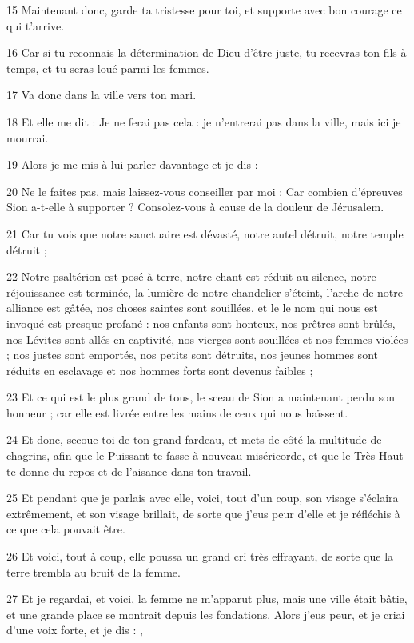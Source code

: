\par 15 Maintenant donc, garde ta tristesse pour toi, et supporte avec bon courage ce qui t'arrive.
\par 16 Car si tu reconnais la détermination de Dieu d'être juste, tu recevras ton fils à temps, et tu seras loué parmi les femmes.
\par 17 Va donc dans la ville vers ton mari.
\par 18 Et elle me dit : Je ne ferai pas cela : je n'entrerai pas dans la ville, mais ici je mourrai.
\par 19 Alors je me mis à lui parler davantage et je dis :
\par 20 Ne le faites pas, mais laissez-vous conseiller par moi ; Car combien d'épreuves Sion a-t-elle à supporter ? Consolez-vous à cause de la douleur de Jérusalem.
\par 21 Car tu vois que notre sanctuaire est dévasté, notre autel détruit, notre temple détruit ;
\par 22 Notre psaltérion est posé à terre, notre chant est réduit au silence, notre réjouissance est terminée, la lumière de notre chandelier s'éteint, l'arche de notre alliance est gâtée, nos choses saintes sont souillées, et le le nom qui nous est invoqué est presque profané : nos enfants sont honteux, nos prêtres sont brûlés, nos Lévites sont allés en captivité, nos vierges sont souillées et nos femmes violées ; nos justes sont emportés, nos petits sont détruits, nos jeunes hommes sont réduits en esclavage et nos hommes forts sont devenus faibles ;
\par 23 Et ce qui est le plus grand de tous, le sceau de Sion a maintenant perdu son honneur ; car elle est livrée entre les mains de ceux qui nous haïssent.
\par 24 Et donc, secoue-toi de ton grand fardeau, et mets de côté la multitude de chagrins, afin que le Puissant te fasse à nouveau miséricorde, et que le Très-Haut te donne du repos et de l'aisance dans ton travail.
\par 25 Et pendant que je parlais avec elle, voici, tout d'un coup, son visage s'éclaira extrêmement, et son visage brillait, de sorte que j'eus peur d'elle et je réfléchis à ce que cela pouvait être.
\par 26 Et voici, tout à coup, elle poussa un grand cri très effrayant, de sorte que la terre trembla au bruit de la femme.
\par 27 Et je regardai, et voici, la femme ne m'apparut plus, mais une ville était bâtie, et une grande place se montrait depuis les fondations. Alors j'eus peur, et je criai d'une voix forte, et je dis : ,
